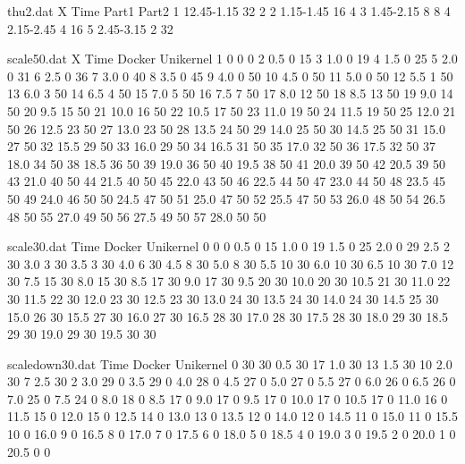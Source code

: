 \begin{filecontents}{thu2.dat}
    X Time   Part1  Part2
    1 12.45-1.15 32 2
    2 1.15-1.45  16 4
    3 1.45-2.15  8 8
    4 2.15-2.45  4 16
    5 2.45-3.15  2   32
    \end{filecontents}

\begin{filecontents}{scale50.dat}
    X   Time Docker Unikernel
    1   0   0   0
    2 0.5 0 15
    3 1.0 0 19
    4 1.5 0 25
    5 2.0 0 31
    6 2.5 0 36
    7 3.0 0 40
    8 3.5 0 45
    9 4.0 0 50
    10 4.5 0 50
    11 5.0 0 50
    12 5.5 1 50
    13 6.0 3 50
    14 6.5 4 50
    15 7.0 5 50
    16 7.5 7 50
    17 8.0 12 50
    18 8.5 13 50
    19 9.0 14 50
    20 9.5 15 50
    21 10.0 16 50
    22 10.5 17 50
    23 11.0 19 50
    24 11.5 19 50
    25 12.0 21 50
    26 12.5 23 50
    27 13.0 23 50
    28 13.5 24 50
    29 14.0 25 50
    30 14.5 25 50
    31 15.0 27 50
    32 15.5 29 50
    33 16.0 29 50
    34 16.5 31 50
    35 17.0 32 50
    36 17.5 32 50
    37 18.0 34 50
    38 18.5 36 50
    39 19.0 36 50
    40 19.5 38 50
    41 20.0 39 50
    42 20.5 39 50
    43 21.0 40 50
    44 21.5 40 50
    45 22.0 43 50
    46 22.5 44 50
    47 23.0 44 50
    48 23.5 45 50
    49 24.0 46 50
    50 24.5 47 50
    51 25.0 47 50
    52 25.5 47 50
    53 26.0 48 50
    54 26.5 48 50
    55 27.0 49 50
    56 27.5 49 50
    57 28.0 50 50

\end{filecontents}

\begin{filecontents}{scale30.dat}
    Time	Docker	Unikernel
    0	0	0
    0.5	0	15
    1.0	0	19
    1.5	0	25
    2.0	0	29
    2.5	2	30
    3.0	3	30
    3.5	3	30
    4.0	6	30
    4.5	8	30
    5.0	8	30
    5.5	10	30
    6.0	10	30
    6.5	10	30
    7.0	12	30
    7.5	15	30
    8.0	15	30
    8.5	17	30
    9.0	17	30
    9.5	20	30
    10.0	20	30
    10.5	21	30
    11.0	22	30
    11.5	22	30
    12.0	23	30
    12.5	23	30
    13.0	24	30
    13.5	24	30
    14.0	24	30
    14.5	25	30
    15.0	26	30
    15.5	27	30
    16.0	27	30
    16.5	28	30
    17.0	28	30
    17.5	28	30
    18.0	29	30
    18.5	29	30
    19.0	29	30
    19.5	30	30

\end{filecontents}


\begin{filecontents}{scaledown30.dat}
    Time	Docker	Unikernel
    0	30	30
    0.5	30	17
    1.0	30	13
    1.5	30	10
    2.0	30	7
    2.5	30	2
    3.0	29	0
    3.5	29	0
    4.0	28	0
    4.5	27	0
    5.0	27	0
    5.5	27	0
    6.0	26	0
    6.5	26	0
    7.0	25	0
    7.5	24	0
    8.0	18	0
    8.5	17	0
    9.0	17	0
    9.5	17	0
    10.0	17	0
    10.5	17	0
    11.0	16	0
    11.5	15	0
    12.0	15	0
    12.5	14	0
    13.0	13	0
    13.5	12	0
    14.0	12	0
    14.5	11	0
    15.0	11	0
    15.5	10	0
    16.0	9	0
    16.5	8	0
    17.0	7	0
    17.5	6	0
    18.0	5	0
    18.5	4	0
    19.0	3	0
    19.5	2	0
    20.0	1	0
    20.5	0	0

\end{filecontents}

